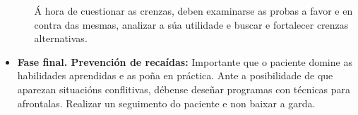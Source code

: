 \documentclass[a4paper,11pt]{article}
\begin{document}
\begin{itemize}
\begin{itemize}
		Á hora de cuestionar as crenzas, deben examinarse as probas a favor e en contra das mesmas, 
		analizar a súa utilidade e buscar e fortalecer crenzas alternativas. 
	\end{itemize}
	\item \textbf{Fase final. Prevención de recaídas:} Importante que o paciente domine as 
	habilidades aprendidas e as poña en práctica. Ante a posibilidade de que aparezan situacións 
	conflitivas, débense deseñar programas con técnicas para afrontalas. Realizar un seguimento do 
	paciente e non baixar a garda. 
\end{itemize}
\end{document}
